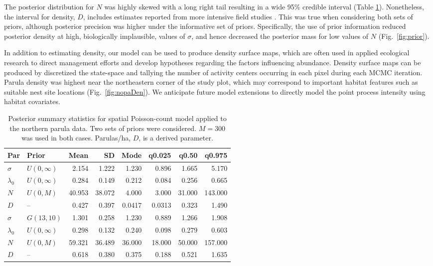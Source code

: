 The posterior distribution for
$N$ was highly skewed with a long right tail resulting in a wide 95\%
credible interval (Table \ref{t:nopaPosts}). Nonetheless, the interval
for density, $D$, includes estimates reported from more intensive field
studies \citep[][]{moldenhaer_regelski_1996}. This was true when
considering
both sets of priors, although posterior precision was higher under the
informative set of priors. Specifically, the use of prior information
reduced posterior density at high, biologically implausible,
values of $\sigma$, and hence decreased the posterior mass for
low values of $N$ (Fig.~\ref{fig:prior}).

In addition to estimating density, our model can be used to produce
density surface maps, which are often used in applied ecological
research to direct management efforts and develop hypotheses regarding
the factors influencing abundance.
Density surface maps can be produced by discretized the
state-space and tallying the number of activity centers occurring in
each pixel during each MCMC iteration. Parula density was
highest near the northeastern corner of the study plot, which may
correspond to important habitat features such as suitable nest site
locations (Fig.~\ref{fig:nopaDen}). We anticipate future model
extensions to directly model the
point process intensity using habitat covariates.


\begin{table}%
  \caption{Posterior summary statistics for spatial Poisson-count
    model applied to the northern parula data. Two sets of priors were
    considered. $M=300$ was used in both cases. Parulas/ha, $D$, is a
    derived parameter.}
  \scriptsize
  \begin{tabular}{l l rrrrrr}
    \hline
    Par        & Prior                  & Mean  & SD    & Mode   & q0.025  & q0.50  & q0.975  \\
    \hline
    $\sigma$   & $U(0, \infty)$   & 2.154   & 1.222  & 1.230   & 0.896   & 1.665   & 5.170    \\
    $\lambda_0$ & $U(0, \infty)$  & 0.284   & 0.149 & 0.212    & 0.084  & 0.256  & 0.665   \\
    $N$        & $U(0, M)$             & 40.953   & 38.072  & 4.000  & 3.000       & 31.000     & 143.000     \\
    $D$        &  --                   & 0.427    & 0.397 & 0.0417   & 0.0313  & 0.323  & 1.490    \\
    \hline
    $\sigma$    & $G(13, 10)$          & 1.301    & 0.258 & 1.230    & 0.889   & 1.266   & 1.908    \\
    $\lambda_0$ & $U(0, \infty)$ & 0.298    & 0.132 & 0.240    & 0.098   & 0.279  & 0.603   \\
    $N$         & $U(0, M)$            & 59.321   & 36.489  & 36.000 & 18.000      & 50.000     & 157.000     \\
    $D$         &  --                  & 0.618    & 0.380 & 0.375   & 0.188   & 0.521  & 1.635    \\
    \hline
  \end{tabular}
  \label{t:nopaPosts}
\vspace{0.5cm}
\end{table}



